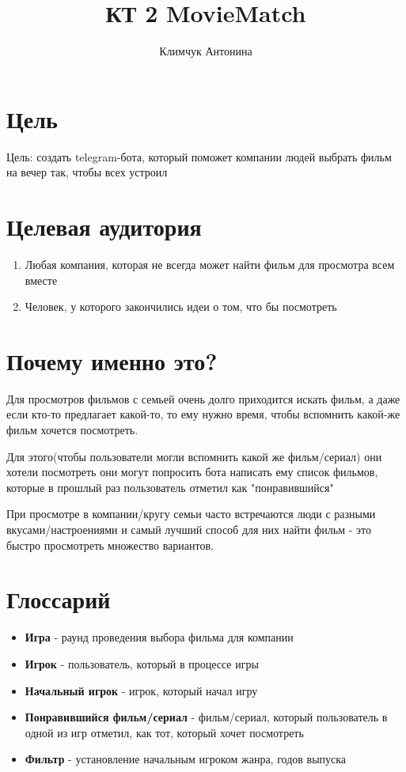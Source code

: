 \documentclass{article}
\title{КТ 2 MovieMatch}
\author{Климчук Антонина}
\begin{document}
\maketitle

\section{Цель}
Цель: создать telegram-бота, который поможет компании людей выбрать фильм на вечер так, чтобы всех устроил

\section{Целевая аудитория}
\begin{enumerate}
    \item Любая компания, которая не всегда может найти фильм для просмотра всем вместе
    \item Человек, у которого закончились идеи о том, что бы посмотреть
\end{enumerate}

\section{Почему именно это?}

Для просмотров фильмов с семьей очень долго приходится искать фильм, а даже если кто-то предлагает какой-то, то ему нужно время, чтобы вспомнить какой-же фильм хочется посмотреть.

Для этого(чтобы пользователи могли вспомнить какой же фильм/сериал) они хотели посмотреть они могут попросить бота написать ему список фильмов, которые в прошлый раз пользователь отметил как "понравившийся"

При просмотре в компании/кругу семьи часто встречаются люди с разными вкусами/настроениями и самый лучший способ для них найти фильм - это быстро просмотреть множество вариантов.


\section{Глоссарий}
\begin{itemize}
    \item \textbf{Игра} - раунд проведения выбора фильма для компании
    \item \textbf{Игрок} - пользователь, который в процессе игры
    \item \textbf{Начальный игрок} - игрок, который начал игру
    \item \textbf{Понравившийся фильм/сериал} - фильм/сериал, который пользователь в одной из игр отметил, как тот, который хочет посмотреть
    \item \textbf{Фильтр} - установление начальным игроком жанра, годов выпуска

\end{itemize}
\end{document}
